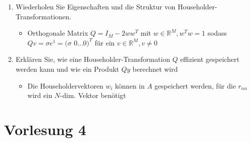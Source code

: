 \documentclass[]{article}
\begin{document}
\begin{enumerate}
		\item Wiederholen Sie Eigenschaften und die Struktur von Householder-Transformationen.
			\begin{itemize}
				\item Orthogonale Matrix $Q = I_M - 2w w^T$ mit $w \in \mathbb{R}^M, w^T w = 1$ sodass $Qv = \sigma e^1 = (\sigma$ $0 \dots 0)^T$ für ein $v \in \mathbb{R}^M, v \neq 0$
			\end{itemize}
		\item Erklären Sie, wie eine Householder-Transformation $Q$ effizient gespeichert werden kann und wie ein Produkt $Qy$ berechnet wird
			\begin{itemize}
				\item Die Householdervektoren $w_i$ können in $A$ gespeichert werden, für die $r_{nn}$ wird ein $N$-dim. Vektor benötigt
			\end{itemize}
	\end{enumerate}

\section{Vorlesung 4}
\end{document}
